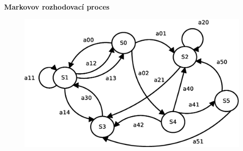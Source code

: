 \documentclass[xcolor=dvipsnames]{beamer}
\begin{document}
\begin{frame}{\bf Markovov rozhodovací proces}

  \begin{figure}[!htb]
  \centering
  \includegraphics[scale=.4]{../diagrams/markovov_process.eps}
  \end{figure}

\end{frame}
\end{document}
